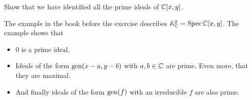 \documentclass[12pt]{memoir}
\begin{document}

\begin{Ej}[3.2.E Vakil]
    Show that we have identified all the prime ideals of $\mathbb{C}[x,y]$.\par
\end{Ej}

The example in the book before the exercise describes $\mathbb{A}^2_{\mathbb{C}}=\operatorname{Spec}\mathbb{C}[x,y]$. The example shows that 
\begin{itemize}
    \itemsep=-0.4em
    \item $0$ is a prime ideal. 
    \item Ideals of the form $\operatorname{gen}(x-a,y-b)$ with $a,b\in\mathbb{C}$ are prime. Even more, that they are maximal. 
    \item And finally ideals of the form $\operatorname{gen}(f)$ with an irreducible $f$ are also prime.
\end{itemize}
\end{document}
